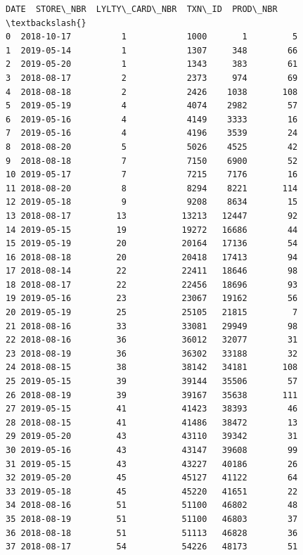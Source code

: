 \documentclass[11pt]{article}
\makeatletter
\newcommand{\boxspacing}{\kern\kvtcb@left@rule\kern\kvtcb@boxsep}
\newcommand{\prompt}[4]{
        {\ttfamily\llap{{\color{#2}[#3]:\hspace{3pt}#4}}\vspace{-\baselineskip}}
    }
\makeatother
\begin{document}
            \begin{tcolorbox}[breakable, size=fbox, boxrule=.5pt, pad at break*=1mm, opacityfill=0]
\prompt{Out}{outcolor}{49}{\boxspacing}
\begin{Verbatim}[commandchars=\\\{\}]
         DATE  STORE\_NBR  LYLTY\_CARD\_NBR  TXN\_ID  PROD\_NBR  \textbackslash{}
0  2018-10-17          1            1000       1         5
1  2019-05-14          1            1307     348        66
2  2019-05-20          1            1343     383        61
3  2018-08-17          2            2373     974        69
4  2018-08-18          2            2426    1038       108
5  2019-05-19          4            4074    2982        57
6  2019-05-16          4            4149    3333        16
7  2019-05-16          4            4196    3539        24
8  2018-08-20          5            5026    4525        42
9  2018-08-18          7            7150    6900        52
10 2019-05-17          7            7215    7176        16
11 2018-08-20          8            8294    8221       114
12 2019-05-18          9            9208    8634        15
13 2018-08-17         13           13213   12447        92
14 2019-05-15         19           19272   16686        44
15 2019-05-19         20           20164   17136        54
16 2018-08-18         20           20418   17413        94
17 2018-08-14         22           22411   18646        98
18 2018-08-17         22           22456   18696        93
19 2019-05-16         23           23067   19162        56
20 2019-05-19         25           25105   21815         7
21 2018-08-16         33           33081   29949        98
22 2018-08-16         36           36012   32077        31
23 2018-08-19         36           36302   33188        32
24 2018-08-15         38           38142   34181       108
25 2019-05-15         39           39144   35506        57
26 2018-08-19         39           39167   35638       111
27 2019-05-15         41           41423   38393        46
28 2018-08-15         41           41486   38472        13
29 2019-05-20         43           43110   39342        31
30 2019-05-16         43           43147   39608        99
31 2019-05-15         43           43227   40186        26
32 2019-05-20         45           45127   41122        64
33 2019-05-18         45           45220   41651        22
34 2018-08-16         51           51100   46802        48
35 2018-08-19         51           51100   46803        37
36 2018-08-18         51           51113   46828        36
37 2018-08-17         54           54226   48173        51

\end{Verbatim}
\end{tcolorbox}
\end{document}

